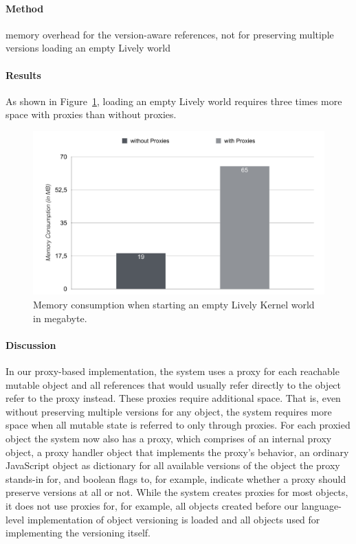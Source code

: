 
\paragraph{Method}
memory overhead for the version-aware references, not for preserving multiple versions
loading an empty Lively world


\paragraph{Results}
As shown in Figure~\ref{fig:MemoryOverhead}, loading an empty Lively world requires three times more space with proxies than without proxies.

\begin{figure}[h]
    \centering
    \includegraphics[width=\textwidth]{figures/6_evaluation/1_memoryOverhead.pdf}
    \caption{Memory consumption when starting an empty Lively Kernel world in megabyte.}
    \label{fig:MemoryOverhead}
\end{figure}

\paragraph{Discussion}
In our proxy-based implementation, the system uses a proxy for each reachable mutable object and all references that would usually refer directly to the object refer to the proxy instead.
These proxies require additional space.
That is, even without preserving multiple versions for any object, the system requires more space when all mutable state is referred to only through proxies.
For each proxied object the system now also has a proxy, which comprises of an internal proxy object, a proxy handler object that implements the proxy's behavior, an ordinary JavaScript object as dictionary for all available versions of the object the proxy stands-in for, and boolean flags to, for example, indicate whether a proxy should preserve versions at all or not.
While the system creates proxies for most objects, it does not use proxies for, for example, all objects created before our language-level implementation of object versioning is loaded and all objects used for implementing the versioning itself.




